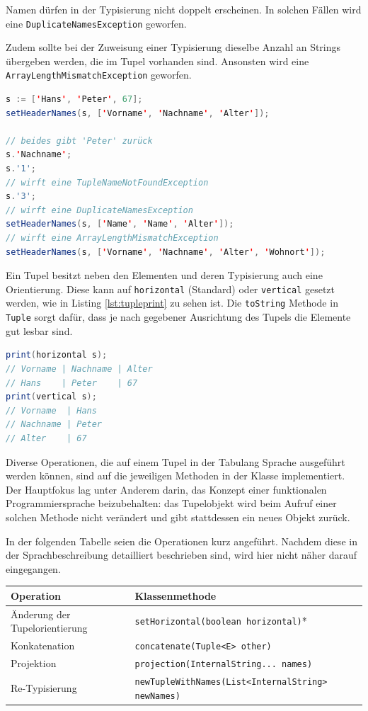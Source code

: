 Namen dürfen in der Typisierung nicht doppelt erscheinen. In solchen Fällen wird eine \lstinline{DuplicateNamesException} geworfen.

Zudem sollte bei der Zuweisung einer Typisierung dieselbe Anzahl an Strings übergeben werden, die im Tupel vorhanden sind. Ansonsten
wird eine \lstinline{ArrayLengthMismatchException} geworfen.

\begin{lstlisting}[caption={Referenzierung von Tupelelementen in Tabulang}, label={lst:tuplerefs}, language=Java]
s := ['Hans', 'Peter', 67];
setHeaderNames(s, ['Vorname', 'Nachname', 'Alter']);

// beides gibt 'Peter' zurück
s.'Nachname';
s.'1';
// wirft eine TupleNameNotFoundException
s.'3';
// wirft eine DuplicateNamesException
setHeaderNames(s, ['Name', 'Name', 'Alter']);
// wirft eine ArrayLengthMismatchException
setHeaderNames(s, ['Vorname', 'Nachname', 'Alter', 'Wohnort']);
\end{lstlisting}

Ein Tupel besitzt neben den Elementen und deren Typisierung auch eine Orientierung. Diese kann auf \lstinline{horizontal} (Standard)
oder \lstinline{vertical} gesetzt werden, wie in Listing \ref{lst:tupleprint} zu sehen ist.
Die \lstinline{toString} Methode in \lstinline{Tuple} sorgt dafür, dass
je nach gegebener Ausrichtung des Tupels die Elemente gut lesbar sind.

\begin{lstlisting}[caption={Tupelausgabe mit gegebener Orientierung}, label={lst:tupleprint}, language=Java]
print(horizontal s);
// Vorname | Nachname | Alter
// Hans    | Peter    | 67
print(vertical s);
// Vorname  | Hans
// Nachname | Peter
// Alter    | 67
\end{lstlisting}

Diverse Operationen, die auf einem Tupel in der Tabulang Sprache ausgeführt werden können, sind auf die jeweiligen
Methoden in der Klasse implementiert. Der Hauptfokus lag unter Anderem darin, das Konzept einer funktionalen Programmiersprache
beizubehalten: das Tupelobjekt wird beim Aufruf einer solchen Methode nicht verändert und gibt stattdessen ein neues Objekt zurück.

In der folgenden Tabelle seien die Operationen kurz angeführt. Nachdem diese in der Sprachbeschreibung detailliert beschrieben sind, wird hier
nicht näher darauf eingegangen.

\begin{center}
    \begin{tabular}{ |l|l| } 
        \hline
        Operation & Klassenmethode \\ 
        \hline
        Änderung der Tupelorientierung & \texttt{setHorizontal(boolean horizontal)}* \\ 
        Konkatenation & \texttt{concatenate(Tuple<E> other)} \\
        Projektion & \texttt{projection(InternalString... names)} \\
        Re-Typisierung & \texttt{newTupleWithNames(List<InternalString> newNames)} \\
        \hline
    \end{tabular}
\end{center}

